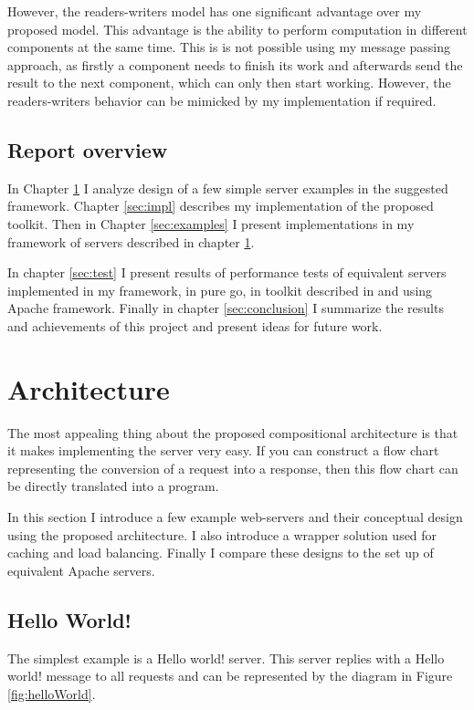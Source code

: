 \documentclass[12pt,a4paper]{article}
\begin{document}
However, the readers-writers model has one significant advantage over
my proposed model. This advantage is the ability to
perform computation in different components at the same time. This is
is not possible using my message passing approach, as firstly a 
component needs to finish its work and afterwards send the result to the next
component, which can only then start working.
However, the readers-writers behavior can be mimicked by my implementation 
if required.

\subsection{Report overview}
In Chapter \ref{sec:arch} I analyze design of a few simple server examples 
in the suggested framework. Chapter \ref{sec:impl} describes my implementation
of the proposed toolkit. Then in Chapter \ref{sec:examples} I present
implementations in my framework of servers described in chapter \ref{sec:arch}.

In chapter \ref{sec:test} I present results of performance tests of equivalent 
servers implemented in my framework, in pure go, in toolkit described
in \cite{whitehead} and using Apache framework. Finally in chapter 
\ref{sec:conclusion} I summarize the results and achievements of this 
project and present ideas for future work.


\newpage
\section{Architecture}
\label{sec:arch}
The most appealing thing about the proposed compositional architecture is that
it makes implementing the server very easy. If you can construct a flow chart 
representing the conversion of a request into a response, then this flow chart
can be directly translated into a program.

In this section I introduce a few example web-servers and their conceptual
design using the proposed architecture. I also introduce a wrapper 
solution used for caching and load balancing.
Finally I compare these designs to the set up of equivalent Apache servers.

\subsection{Hello World!}
\label{sec:helloWorld}
The simplest example is a Hello world! server. This server replies with a 
Hello world! message to all requests and can be represented by the diagram
in Figure \ref{fig:helloWorld}.
\end{document}
